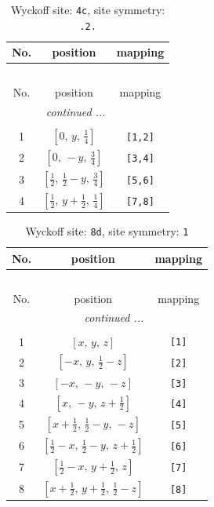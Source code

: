 \documentclass[fleqn,8pt]{jsarticle}
\begin{document}
\renewcommand{\arraystretch}{1.2}
\begin{longtable}{ccc}
\caption{Wyckoff site: {\tt 4c}, site symmetry: {\tt .2.}}
 \\
 \hline \hline
No. & position & mapping \\ \hline \endfirsthead

\multicolumn{2}{l}{\tablename\ \thetable{}} \\
 \hline \hline
No. & position & mapping \\ \hline \endhead

 \hline \hline
\multicolumn{2}{r}{\footnotesize\it continued ...} \\ \endfoot

 \hline \hline
\multicolumn{2}{r}{} \\ \endlastfoot

1 & $\left[ 0,\, y,\, \frac{1}{4} \right]$ & {\tt [1,2]} \\ \hline
2 & $\left[ 0,\, - y,\, \frac{3}{4} \right]$ & {\tt [3,4]} \\ \hline
3 & $\left[ \frac{1}{2},\, \frac{1}{2} - y,\, \frac{3}{4} \right]$ & {\tt [5,6]} \\ \hline
4 & $\left[ \frac{1}{2},\, y + \frac{1}{2},\, \frac{1}{4} \right]$ & {\tt [7,8]} \\
\end{longtable}
\renewcommand{\arraystretch}{1.2}
\begin{longtable}{ccc}
\caption{Wyckoff site: {\tt 8d}, site symmetry: {\tt 1}}
 \\
 \hline \hline
No. & position & mapping \\ \hline \endfirsthead

\multicolumn{2}{l}{\tablename\ \thetable{}} \\
 \hline \hline
No. & position & mapping \\ \hline \endhead

 \hline \hline
\multicolumn{2}{r}{\footnotesize\it continued ...} \\ \endfoot

 \hline \hline
\multicolumn{2}{r}{} \\ \endlastfoot

1 & $\left[ x,\, y,\, z \right]$ & {\tt [1]} \\ \hline
2 & $\left[ - x,\, y,\, \frac{1}{2} - z \right]$ & {\tt [2]} \\ \hline
3 & $\left[ - x,\, - y,\, - z \right]$ & {\tt [3]} \\ \hline
4 & $\left[ x,\, - y,\, z + \frac{1}{2} \right]$ & {\tt [4]} \\ \hline
5 & $\left[ x + \frac{1}{2},\, \frac{1}{2} - y,\, - z \right]$ & {\tt [5]} \\ \hline
6 & $\left[ \frac{1}{2} - x,\, \frac{1}{2} - y,\, z + \frac{1}{2} \right]$ & {\tt [6]} \\ \hline
7 & $\left[ \frac{1}{2} - x,\, y + \frac{1}{2},\, z \right]$ & {\tt [7]} \\ \hline
8 & $\left[ x + \frac{1}{2},\, y + \frac{1}{2},\, \frac{1}{2} - z \right]$ & {\tt [8]} \\
\end{longtable}
\end{document}
